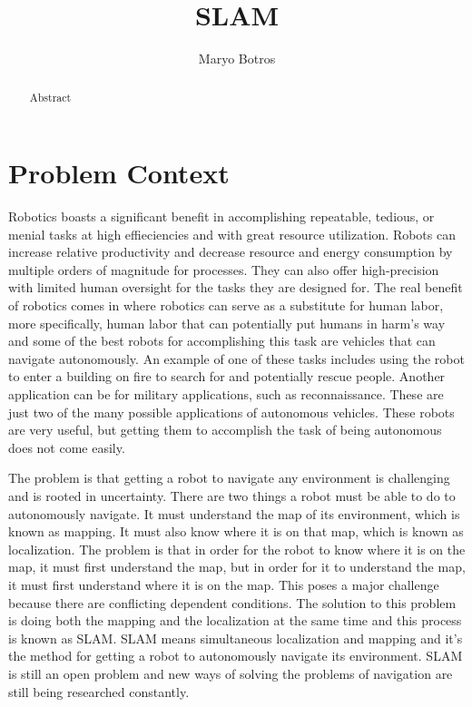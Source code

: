 \documentclass[10pt,twocolumn]{article}
\title{SLAM}
\author{Maryo Botros}
\affiliation{Occidental College}
\begin{document}
\maketitle

\begin{abstract}
    Abstract
\end{abstract}

\section{Problem Context}

Robotics boasts a significant benefit in accomplishing repeatable, tedious, or menial tasks at high effieciencies and with great resource utilization. Robots can increase relative productivity and decrease resource and energy consumption by multiple orders of magnitude for processes. They can also offer high-precision with limited human oversight for the tasks they are designed for. The real benefit of robotics comes in where robotics can serve as a substitute for human labor, more specifically, human labor that can potentially put humans in harm's way and some of the best robots for accomplishing this task are vehicles that can navigate autonomously. An example of one of these tasks includes using the robot to enter a building on fire to search for and potentially rescue people. Another application can be for military applications, such as reconnaissance. These are just two of the many possible applications of autonomous vehicles. These robots are very useful, but getting them to accomplish the task of being autonomous does not come easily.

The problem is that getting a robot to navigate any environment is challenging and is rooted in uncertainty. There are two things a robot must be able to do to autonomously navigate. It must understand the map of its environment, which is known as mapping. It must also know where it is on that map, which is known as localization. The problem is that in order for the robot to know where it is on the map, it must first understand the map, but in order for it to understand the map, it must first understand where it is on the map. This poses a major challenge because there are conflicting dependent conditions. The solution to this problem is doing both the mapping and the localization at the same time and this process is known as SLAM. SLAM means simultaneous localization and mapping and it's the method for getting a robot to autonomously navigate its environment. SLAM is still an open problem and new ways of solving the problems of navigation are still being researched constantly.
\end{document}
